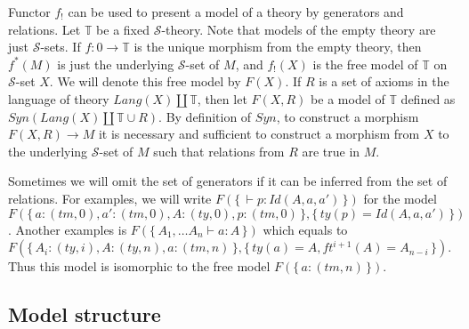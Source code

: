 \documentclass[reqno]{amsart}
\theoremstyle{definition}
\theoremstyle{remark}
\numberwithin{figure}{section}
\begin{document}
Functor $f_!$ can be used to present a model of a theory by generators and relations.
Let $\mathbb{T}$ be a fixed $\mathcal{S}$-theory.
Note that models of the empty theory are just $\mathcal{S}$-sets.
If $f : 0 \to \mathbb{T}$ is the unique morphism from the empty theory, then $f^*(M)$ is just the underlying $\mathcal{S}$-set of $M$,
    and $f_!(X)$ is the free model of $\mathbb{T}$ on $\mathcal{S}$-set $X$.
We will denote this free model by $F(X)$.
If $R$ is a set of axioms in the language of theory $Lang(X) \amalg \mathbb{T}$,
    then let $F(X,R)$ be a model of $\mathbb{T}$ defined as $Syn(Lang(X) \amalg \mathbb{T} \cup R)$.
By definition of $Syn$, to construct a morphism $F(X,R) \to M$ it is necessary and sufficient
    to construct a morphism from $X$ to the underlying $\mathcal{S}$-set of $M$ such that relations from $R$ are true in $M$.

Sometimes we will omit the set of generators if it can be inferred from the set of relations.
For examples, we will write $F(\{\,\vdash p : Id(A,a,a')\,\})$ for the model $F(\{\,a : (tm,0), a' : (tm,0), A : (ty,0), p : (tm,0)\,\}, \{\,ty(p) = Id(A,a,a')\,\})$.
Another examples is $F(\{\,A_1, \ldots A_n \vdash a : A\,\})$ which equals to $F(\{\,A_i : (ty,i), A : (ty,n), a : (tm,n)\,\}, \{\,ty(a) = A, ft^{i+1}(A) = A_{n-i}\,\})$.
Thus this model is isomorphic to the free model $F(\{\,a : (tm,n)\,\})$.

\subsection{Model structure}
\end{document}
